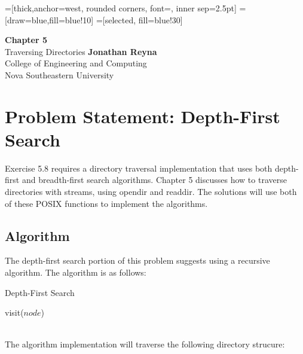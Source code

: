 \documentclass[a4paper,12pt,sffamily]{article}
\begin{document}
=[thick,anchor=west, rounded corners, font={\scriptsize\ttfamily}, inner sep=2.5pt]
=[draw=blue,fill=blue!10]
=[selected, fill=blue!30]

\begin{titlepage}
  \begin{center}
    \vspace*{1cm}
    \Huge
    \textbf{Chapter 5}\\
    \vspace{0.5cm}
    \LARGE
    Traversing Directories
    \vfill
    \Large
    \textbf{Jonathan Reyna}\\
    College of Engineering and Computing\\
    Nova Southeastern University\\
    \usdate{\today}
  \end{center}
\end{titlepage}
\tableofcontents
\pagebreak
\section{Problem Statement: Depth-First Search}
Exercise 5.8 requires a directory traversal implementation that uses both depth-first and breadth-first search algorithms. Chapter 5 discusses how to traverse directories with streams, using opendir and readdir. The solutions will use both of these POSIX functions to implement the algorithms.
\subsection{Algorithm}
The depth-first search portion of this problem suggests using a recursive algorithm. The algorithm is as follows:
\begin{algorithm}
  \caption{Depth-First Search}
  \label{depthfirst}
  \begin{algorithmic}[1]
    \State visit($node$)
    \State{}
    \EndIf
    \EndFor
    \EndProcedure
  \end{algorithmic}
\end{algorithm}\\
The algorithm implementation will traverse the following directory strucure:\\
\end{document}
